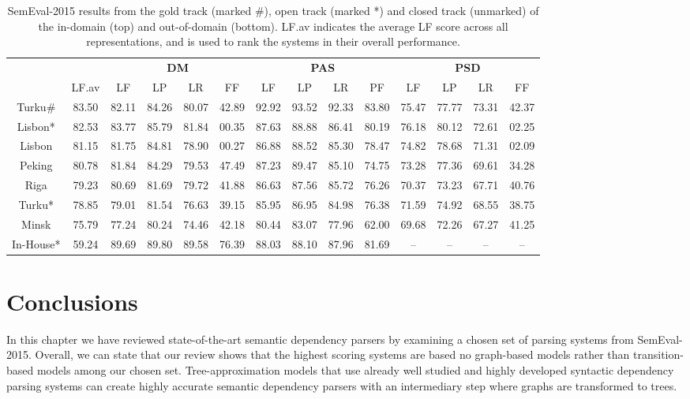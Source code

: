 \begin{table}
\begin{tabular}{@{}cccccccccccccc@{}}
        \\
        \toprule
        \multicolumn{1}{c}{ }
        & \multicolumn{1}{c}{ }
        & \multicolumn{4}{c}{\textbf{DM}}
        & \multicolumn{4}{c}{\textbf{PAS}}
        & \multicolumn{4}{c}{\textbf{PSD}} \\
        \cmidrule(lr){3-6}
        \cmidrule(lr){7-10}
        \cmidrule(lr){11-14}
        &
        LF.av &
        LF & LP & LR & FF &
        LF & LP & LR & PF &
        LF & LP & LR & FF \\
        \midrule
        Turku\# & 83.50 & 82.11 & 84.26 & 80.07 & 42.89 & 92.92 & 93.52 & 92.33 & 83.80 & 75.47 & 77.77 & 73.31 & 42.37 \\
        Lisbon* & 82.53 & 83.77 & 85.79 & 81.84 & 00.35 & 87.63 & 88.88 & 86.41 & 80.19 & 76.18 & 80.12 & 72.61 & 02.25 \\
        Lisbon & 81.15 & 81.75 & 84.81 & 78.90 & 00.27 & 86.88 & 88.52 & 85.30 & 78.47 & 74.82 & 78.68 & 71.31 & 02.09 \\
        Peking & 80.78 & 81.84 & 84.29 & 79.53 & 47.49 & 87.23 & 89.47 & 85.10 & 74.75 & 73.28 & 77.36 & 69.61 & 34.28 \\
        Riga & 79.23 & 80.69 & 81.69 & 79.72 & 41.88 & 86.63 & 87.56 & 85.72 & 76.26 & 70.37 & 73.23 & 67.71 & 40.76 \\
        Turku* & 78.85 & 79.01 & 81.54 & 76.63 & 39.15 & 85.95 & 86.95 & 84.98 & 76.38 & 71.59 & 74.92 & 68.55 & 38.75 \\
        Minsk & 75.79 & 77.24 & 80.24 & 74.46 & 42.18 & 80.44 & 83.07 & 77.96 & 62.00 & 69.68 & 72.26 & 67.27 & 41.25 \\
        In-House* & 59.24 & 89.69 & 89.80 & 89.58 & 76.39 & 88.03 & 88.10 & 87.96 & 81.69 & – & – & – & – \\
        \bottomrule
    \end{tabular}
    \caption{SemEval-2015 results from the gold track (marked \#), open track (marked *) and closed track (unmarked) of the in-domain (top) and out-of-domain (bottom). LF.av indicates the average LF score across all representations, and is used to rank the systems in their overall performance.}
    \label{fig:results}
\end{table}

\section{Conclusions}

In this chapter we have reviewed state-of-the-art semantic dependency parsers by examining a chosen set of parsing systems from SemEval-2015. Overall, we can state that our review shows that the highest scoring systems are based no graph-based models rather than transition-based models among our chosen set. Tree-approximation models that use already well studied and highly developed syntactic dependency parsing systems can create highly accurate semantic dependency parsers with an intermediary step where graphs are transformed to trees.

